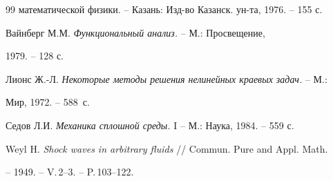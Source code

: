 \begin{thebibliography}{99}
{математической физики.} -- Казань: Изд-во Казанск. ун-та, 1976. -- 155 с. 




Вайнберг М.М. {\em Функциональный анализ.} -- М.: Просвещение, 


1979. -- 128 с. 




Лионс Ж.-Л. {\em Некоторые методы решения нелинейных краевых задач.} -- М.: 


Мир, 1972. -- 588~с. 




Седов Л.И. {\em Механика сплошной среды.} I -- М.: Наука, 1984. -- 559 с. 




Weyl H. {\em Shock waves in arbitrary fluids} // Commun. Pure and Appl. Math. 


-- 1949. -- V.\,2--3. -- P.\,103--122. 


 


\end{thebibliography} 


 


\vskip 2cm 


 






 


 


 


